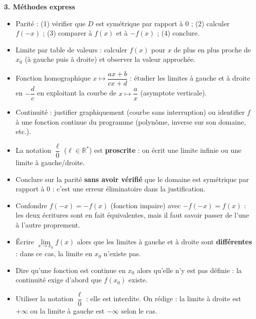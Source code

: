 \documentclass[11pt]{article}
\newcommand{\cle}[1]{{\popxbold\color{popdark}#1}}
\begin{document}
\begin{aretenir}
\textbf{3. Méthodes express}
\begin{itemize}
  \item \cle{Parité} : (1) vérifier que $D$ est symétrique par rapport à $0$ ; (2) calculer $f(-x)$ ; (3) comparer à $f(x)$ et à $-f(x)$ ; (4) conclure.
  \item \cle{Limite par table de valeurs} : calculer $f(x)$ pour $x$ de plus en plus proche de $x_0$ (à gauche puis à droite) et observer la valeur approchée.
  \item \cle{Fonction homographique} $x\mapsto\dfrac{ax+b}{cx+d}$ : étudier les limites à gauche et à droite en $-\dfrac{d}{c}$ en exploitant la courbe de $x\mapsto\dfrac{a}{x}$ (asymptote verticale).
  \item \cle{Continuité} : justifier graphiquement (courbe sans interruption) ou identifier $f$ à une fonction continue du programme (polynôme, inverse sur son domaine, etc.).
  \item La notation $\dfrac{\ell}{0}$ ($\ell\in\mathbb{R}^*$) est \textbf{proscrite} : on écrit une limite infinie ou une limite à gauche/droite.
\end{itemize}
\end{aretenir}

\begin{attention}
\begin{itemize}
  \item Conclure sur la parité \textbf{sans avoir vérifié} que le domaine est symétrique par rapport à $0$ : c'est une erreur éliminatoire dans la justification.
  \item Confondre $f(-x)=-f(x)$ (fonction impaire) avec $-f(-x)=f(x)$ : les deux écritures sont en fait équivalentes, mais il faut savoir passer de l'une à l'autre proprement.
  \item Écrire $\lim\limits_{x\to x_0}f(x)$ alors que les limites à gauche et à droite sont \textbf{différentes} : dans ce cas, la limite en $x_0$ n'existe pas.
  \item Dire qu'une fonction est continue en $x_0$ alors qu'elle n'y est pas définie : la continuité exige d'abord que $f(x_0)$ existe.
  \item Utiliser la notation $\dfrac{\ell}{0}$ : elle est interdite. On rédige : \og la limite à droite est $+\infty$ \fg{} ou \og la limite à gauche est $-\infty$ \fg{} selon le cas.
\end{itemize}
\end{attention}
\end{document}

